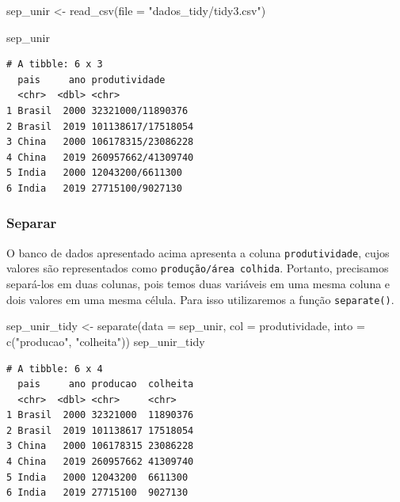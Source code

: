 \documentclass[
  brazilian,
]{book}
\newenvironment{Shaded}{\begin{snugshade}}{\end{snugshade}}
\newcommand{\AttributeTok}[1]{\textcolor[rgb]{0.77,0.63,0.00}{#1}}
\newcommand{\FunctionTok}[1]{\textcolor[rgb]{0.00,0.00,0.00}{#1}}
\newcommand{\NormalTok}[1]{#1}
\newcommand{\OtherTok}[1]{\textcolor[rgb]{0.56,0.35,0.01}{#1}}
\newcommand{\StringTok}[1]{\textcolor[rgb]{0.31,0.60,0.02}{#1}}
\begin{document}
\begin{Shaded}
\begin{Highlighting}[]
\NormalTok{sep\_unir }\OtherTok{\textless{}{-}} \FunctionTok{read\_csv}\NormalTok{(}\AttributeTok{file =} \StringTok{"dados\_tidy/tidy3.csv"}\NormalTok{)}

\NormalTok{sep\_unir}
\end{Highlighting}
\end{Shaded}

\begin{verbatim}
# A tibble: 6 x 3
  pais     ano produtividade     
  <chr>  <dbl> <chr>             
1 Brasil  2000 32321000/11890376 
2 Brasil  2019 101138617/17518054
3 China   2000 106178315/23086228
4 China   2019 260957662/41309740
5 India   2000 12043200/6611300  
6 India   2019 27715100/9027130  
\end{verbatim}

\hypertarget{separar}{%
\subsubsection*{Separar}\label{separar}}

O banco de dados apresentado acima apresenta a coluna \texttt{produtividade}, cujos valores são representados como \texttt{produção/área\ colhida}. Portanto, precisamos separá-los em duas colunas, pois temos duas variáveis em uma mesma coluna e dois valores em uma mesma célula. Para isso utilizaremos a função \texttt{separate()}.

\begin{Shaded}
\begin{Highlighting}[]
\NormalTok{sep\_unir\_tidy }\OtherTok{\textless{}{-}} \FunctionTok{separate}\NormalTok{(}\AttributeTok{data =}\NormalTok{ sep\_unir,}
                          \AttributeTok{col =}\NormalTok{ produtividade,}
                          \AttributeTok{into =} \FunctionTok{c}\NormalTok{(}\StringTok{"producao"}\NormalTok{, }\StringTok{"colheita"}\NormalTok{))}
\NormalTok{sep\_unir\_tidy}
\end{Highlighting}
\end{Shaded}

\begin{verbatim}
# A tibble: 6 x 4
  pais     ano producao  colheita
  <chr>  <dbl> <chr>     <chr>   
1 Brasil  2000 32321000  11890376
2 Brasil  2019 101138617 17518054
3 China   2000 106178315 23086228
4 China   2019 260957662 41309740
5 India   2000 12043200  6611300 
6 India   2019 27715100  9027130 
\end{verbatim}
\end{document}
